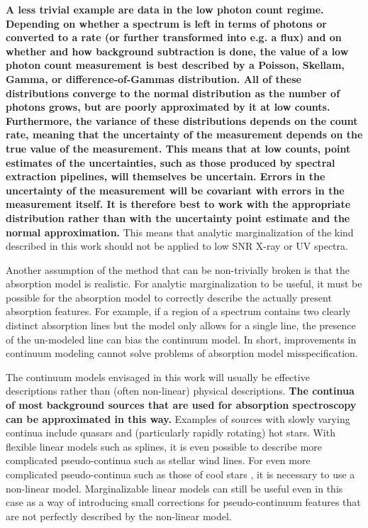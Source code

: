 \documentclass[trackchanges]{aastex62}
\begin{document}
{\color{red}\bf
A less trivial example are data in the low photon count regime.
Depending on whether a spectrum is left in terms of photons or converted to a rate (or further transformed into e.g. a flux) and on whether and how background subtraction is done, the value of a low photon count measurement is best described by a Poisson, Skellam, Gamma, or difference-of-Gammas distribution.
All of these distributions converge to the normal distribution as the number of photons grows, but are poorly approximated by it at low counts.
Furthermore, the variance of these distributions depends on the count rate, meaning that the uncertainty of the measurement depends on the true value of the measurement.
This means that at low counts, point estimates of the uncertainties, such as those produced by spectral extraction pipelines, will themselves be uncertain.
Errors in the uncertainty of the measurement will be covariant with errors in the measurement itself.
It is therefore best to work with the appropriate distribution rather than with the uncertainty point estimate and the normal approximation.
}
This means that analytic marginalization of the kind described in this work should not be applied to low SNR X-ray or UV spectra.

Another assumption of the method that can be non-trivially broken is that the absorption model is realistic.
For analytic marginalization to be useful, it must be possible for the absorption model to correctly describe the actually present absorption features.
For example, if a region of a spectrum contains two clearly distinct absorption lines but the model only allows for a single line, the presence of the un-modeled line can bias the continuum model.
In short, improvements in continuum modeling cannot solve problems of absorption model misspecification.


The continuum models envisaged in this work will usually be effective descriptions rather than (often non-linear) physical descriptions.
{\color{red} \bf The continua of most background sources that are used for absorption spectroscopy can be approximated in this way.}
Examples of sources with slowly varying continua include quasars and (particularly rapidly rotating) hot stars.
With flexible linear models such as splines, it is even possible to describe more complicated pseudo-continua such as stellar wind lines.
For even more complicated pseudo-continua such as those of cool stars \citep[e.g.]{Zasowski:2015hi}, it is necessary to use a non-linear model.
Marginalizable linear models can still be useful even in this case as a way of introducing small corrections for pseudo-continuum features that are not perfectly described by the non-linear model.
\end{document}
